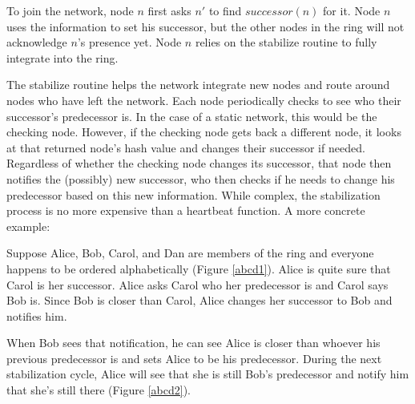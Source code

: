 \documentclass[conference, compsocconf, letterpaper]{IEEEtran}
\begin{document}
To join the network, node $n$ first asks $n'$ to find $successor(n)$ for it.  Node $n$ uses the information to set his successor, but the other nodes in the ring will not acknowledge $n$'s presence yet.  Node $n$ relies on the stabilize routine to fully integrate into the ring.

The stabilize routine helps the network integrate new nodes and route around nodes who have left the network. Each node periodically checks to see who their successor's predecessor is.  In the case of a static network, this would be the checking node.  However, if the checking node gets back a different node, it looks at that returned node's hash value and changes their successor if needed.  Regardless of whether the checking node changes its successor, that node then notifies the (possibly) new successor,  who then checks if he needs to change his predecessor based on this new information.  While complex, the stabilization process is no more expensive than a heartbeat function.  A more concrete example:


Suppose Alice, Bob, Carol, and Dan are members of the ring and everyone happens to be ordered alphabetically (Figure \ref{abcd1}). Alice is quite sure that Carol is her successor.  Alice asks Carol who her predecessor is and Carol says Bob is.  Since Bob is closer than Carol, Alice changes her successor to Bob and notifies him.  

When Bob sees that notification, he can see Alice is closer than whoever his previous predecessor is and sets Alice to be his predecessor.  During the next stabilization cycle, Alice will see that she is still Bob's predecessor and notify him that she's still there (Figure \ref{abcd2}).




\end{document}

